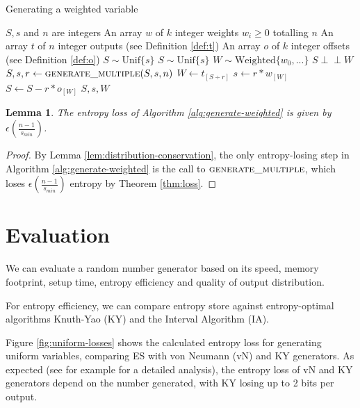 \documentclass[lettersize,onecolumn]{IEEEtran}
\newtheorem{lemma}{Lemma}
\newcommand{\indep}{\perp\!\!\!\perp}
\newcommand{\unif}[1]{\mathrm{Unif}\{#1\}}
\begin{document}
\begin{algorithm}
\caption{Generating a weighted variable}
\label{alg:generate-weighted}
\begin{algorithmic}[1]
\Require $S, s$ and $n$ are integers
\Require An array $w$ of $k$ integer weights $w_i \ge 0$ totalling $n$
\Require An array $t$ of $n$ integer outputs (see Definition \ref{def:t})
\Require An array $o$ of $k$ integer offsets (see Definition \ref{def:o})
\Require $S \sim \unif{s}$
\Ensure $S \sim \unif{s}$
\Ensure $W \sim \mathrm{Weighted}\{w_0, ...\}$
\Ensure $S \indep W$
    \State $S, s, r \gets \textsc{generate\_multiple}(S, s, n)$
    \State $W \gets t_{[S \div r]}$
    \State $s \gets r * w_{[W]}$
    \State $S \gets S - r * o_{[W]}$
    \State \Return $S, s, W$
\EndProcedure
\end{algorithmic}
\end{algorithm}

\begin{lemma}
    The entropy loss of Algorithm \ref{alg:generate-weighted} is given by $\epsilon(\frac{n-1}{s_{min}})$.
\end{lemma}

\begin{proof}
    By Lemma \ref{lem:distribution-conservation}, the only entropy-losing step in Algorithm \ref{alg:generate-weighted} is the call to $\textsc{generate\_multiple}$, which loses $\epsilon(\frac{n-1}{s_{min}})$ entropy by Theorem \ref{thm:loss}.
\end{proof}

\section {Evaluation}

We can evaluate a random number generator based on its speed, memory footprint, setup time, entropy efficiency and quality of output distribution. \cite{saad2025}

For entropy efficiency, we can compare entropy store against entropy-optimal algorithms Knuth-Yao (KY) and the Interval Algorithm (IA).

Figure \ref{fig:uniform-losses} shows the calculated entropy loss for generating uniform variables, comparing ES with von Neumann (vN) and KY generators. As expected (see for example \cite{bacher2017} for a detailed analysis), the entropy loss of vN and KY generators depend on the number generated, with KY losing up to 2 bits per output.
\end{document}
